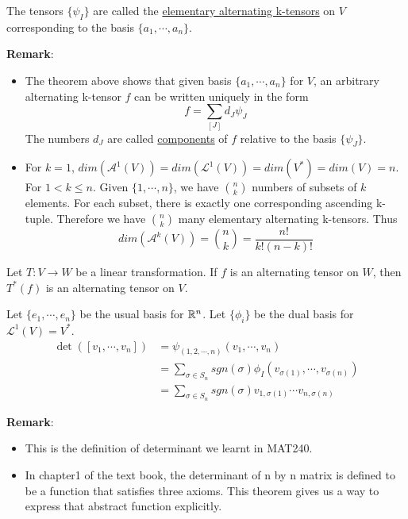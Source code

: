 \begin{definition}
    The tensors $\{\psi_I\}$ are called the \underline{elementary alternating k-tensors} on $V$ corresponding to the basis $\{a_1,\cdots,a_n\}$.
\end{definition}
\noindent\textbf{Remark}:
\begin{itemize}
    \item The theorem above shows that given basis $\{a_1,\cdots,a_n\}$ for $V$, an arbitrary alternating k-tensor $f$ can be written uniquely in the form $$f=\sum_{[J]}d_J\psi_J$$
    The numbers $d_J$ are called \underline{components} of $f$ relative to the basis $\{\psi_J\}$.
    \item For $k=1$, $dim(\mathcal{A}^1(V))=dim(\mathcal{L}^1(V))=dim(V^*)=dim(V)=n$.\\
    For $1<k\leq n$. Given $\{1,\cdots,n\}$, we have ${n \choose k}$ numbers of subsets of $k$ elements. For each subset, there is exactly one corresponding ascending k-tuple. Therefore we have ${n \choose k}$ many elementary alternating k-tensors.
    Thus $$dim(\mathcal{A}^k(V))={n \choose k}=\frac{n!}{k!(n-k)!}$$
\end{itemize}

\begin{theorem}
    Let $T:V\longrightarrow W$ be a linear transformation. If $f$ is an alternating tensor on $W$, then $T^*(f)$ is an alternating tensor on $V$.
\end{theorem}

\begin{theorem}
    Let $\{e_1,\cdots,e_n\}$ be the usual basis for $\mathbb{R}^n$. Let $\{\phi_i\}$ be the dual basis for $\mathcal{L}^1(V)=V^*$. 
    \begin{equation*}
        \begin{split}
            \det([v_1,\cdots,v_n])&=\psi_{(1,2,\cdots,n)}(v_1,\cdots,v_n)\\
            &= \sum_{\sigma\in S_n}sgn(\sigma)\phi_I(v_{\sigma(1)},\cdots,v_{\sigma(n)})\\
            &= \sum_{\sigma\in S_n}sgn(\sigma)v_{1,\sigma(1)}\cdots v_{n,\sigma(n)}
        \end{split}
    \end{equation*}
\end{theorem}
\noindent\textbf{Remark}:
\begin{itemize}
    \item This is the definition of determinant we learnt in MAT240. 
    \item In chapter1 of the text book, the determinant of n by n matrix is defined to be a function that satisfies three axioms. This theorem gives us a way to express that abstract function explicitly.
\end{itemize}

